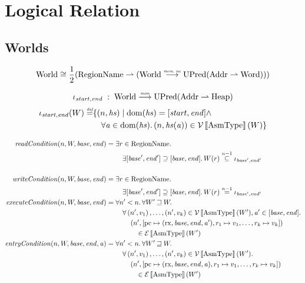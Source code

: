 \documentclass{article}
\newcommand{\sem}[1]{\left\llbracket #1 \right\rrbracket}
\newcommand{\parfun}{\rightharpoonup}
\newcommand{\monnefun}{\stackrel{\textit{\tiny{mon, ne}}}{\longrightarrow}}
\newcommand{\monfun}{\stackrel{\textit{\tiny{mon}}}{\longrightarrow}}
\newcommand{\defeq}{\stackrel{\textit{\tiny{def}}}{=}}
\newcommand{\nequal}[1][n]{\stackrel{\tiny{#1}}{=}}
\newcommand{\nsubeq}[1][n]{\stackrel{\tiny{#1}}{\subseteq}}
\DeclareMathOperator{\dom}{dom}
\newcommand{\var}[1]{\mathit{#1}}
\newcommand{\pcreg}{\mathrm{pc}}
\newcommand{\addr}{\var{a}}
\newcommand{\start}{\var{base}}
\newcommand{\addrend}{\var{end}}
\newcommand{\heapseg}{\var{hs}}
\newcommand{\plainfun}[1]{\mathit{#1}}
\newcommand{\readCond}[1]{\plainfun{readCondition}(#1)}
\newcommand{\writeCond}[1]{\plainfun{writeCondition}(#1)}
\newcommand{\execCond}[1]{\plainfun{executeCondition}(#1)}
\newcommand{\entryCond}[1]{\plainfun{entryCondition}(#1)}
\newcommand{\future}{\mathbin{\sqsupseteq}}
\newcommand{\asmType}{\plaindom{AsmType}}
\newcommand{\plaindom}[1]{\mathrm{#1}}
\newcommand{\Words}{\plaindom{Word}}
\newcommand{\Addrs}{\plaindom{Addr}}
\newcommand{\Heaps}{\plaindom{Heap}}
\newcommand{\RegionName}{\plaindom{RegionName}}
\newcommand{\Worlds}{\plaindom{World}}
\newcommand{\UPred}[1]{\plaindom{UPred}(#1)}
\newcommand{\intr}[2]{\mathcal{#1}\sem{#2}}
\newcommand{\valueintr}[1]{\intr{V}{#1}}
\newcommand{\exprintr}[1]{\intr{E}{#1}}
\newcommand{\stdvr}{\valueintr{\asmType}}
\newcommand{\stder}{\exprintr{\asmType}}
\newcommand{\npair}[2][n]{\left(#1,#2 \right)}
\newcommand{\plainperm}[1]{\mathrm{#1}}
\newcommand{\exec}{\plainperm{rx}}
\begin{document}
\section{Logical Relation}
\label{sec:logical-relation}
\subsection{Worlds}
\[
\Worlds \cong \frac{1}{2} (\RegionName \parfun (\Worlds \monnefun \UPred{\Addrs \parfun \Words}))
\]

\[
  \iota_{\var{start},\var{end}} \; : \; \Worlds \monfun \UPred{\Addrs \parfun \Heaps}
\]
\begin{align*}
  \iota_{\var{start},\var{end}}(W) \defeq & \{ \npair{\heapseg} \mid \dom(\heapseg) = [\var{start},\var{end}] \land \\
                                     & \quad \forall \addr \in \dom(\heapseg) \ldotp \npair{\heapseg(\addr)} \in \stdvr(W) \}
\end{align*}

\begin{align*}
  \readCond{n,W,\start,\addrend} = & \;\exists r \in \RegionName \ldotp \\
                                   & \;\quad \exists [\start',\addrend'] \supseteq [\start,\addrend] \ldotp W(r) \nsubeq[n-1] \iota_{\start',\addrend'} \\ & \\
  \writeCond{n,W,\start,\addrend} = & \; \exists r \in \RegionName \ldotp \\
                                   & \;\quad \exists [\start',\addrend'] \supseteq [\start,\addrend] \ldotp W(r) \nequal[n-1] \iota_{\start',\addrend'} \\
  \execCond{n,W,\start,\addrend} = & \; \forall n' < n \ldotp \forall W' \future W \ldotp \\
                                   & \; \quad \forall \npair[n']{v_1},\dots,\npair[n']{v_k} \in \stdvr(W'),\addr' \in [\start, \addrend] \ldotp \\
                                   & \; \qquad \npair[n']{[\pcreg \mapsto (\exec,\start,\addrend,\addr'), r_1 \mapsto v_1, \dots , r_k \mapsto v_k]} \\
                                   & \; \qquad \quad \in \stder(W') \\
  \entryCond{n,W,\start,\addrend,\addr} = & \; \forall n' < n \ldotp \forall W' \future W \ldotp \\
                                   & \; \quad \forall \npair[n']{v_1},\dots,\npair[n']{v_k} \in \stdvr(W') \ldotp \\
                                   & \; \qquad \npair[n']{[\pcreg \mapsto (\exec,\start,\addrend,\addr), r_1 \mapsto v_1, \dots , r_k \mapsto v_k]} \\
                                   & \; \qquad \quad \in \stder(W') \\
\end{align*}
\end{document}

